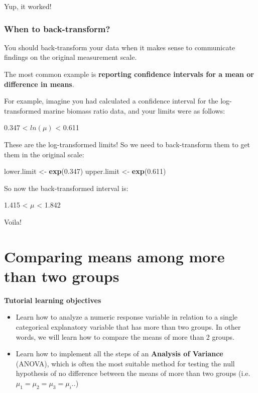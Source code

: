 \documentclass[
]{book}
\newenvironment{Shaded}{\begin{snugshade}}{\end{snugshade}}
\newcommand{\FloatTok}[1]{\textcolor[rgb]{0.00,0.00,0.81}{#1}}
\newcommand{\FunctionTok}[1]{\textcolor[rgb]{0.13,0.29,0.53}{\textbf{#1}}}
\newcommand{\NormalTok}[1]{#1}
\newcommand{\OtherTok}[1]{\textcolor[rgb]{0.56,0.35,0.01}{#1}}
\providecommand{\tightlist}{%
  \setlength{\itemsep}{0pt}\setlength{\parskip}{0pt}}
\begin{document}
Yup, it worked!

\subsection{When to back-transform?}\label{when_back}

You should back-transform your data when it makes sense to communicate findings on the original measurement scale.

The most common example is \textbf{reporting confidence intervals for a mean or difference in means}.

For example, imagine you had calculated a confidence interval for the log-transformed marine biomass ratio data, and your limits were as follows:

0.347 \textless{} \(ln(\mu)\) \textless{} 0.611

These are the log-transformed limits! So we need to back-transform them to get them in the original scale:

\begin{Shaded}
\begin{Highlighting}[]
\NormalTok{lower.limit }\OtherTok{\textless{}{-}} \FunctionTok{exp}\NormalTok{(}\FloatTok{0.347}\NormalTok{)}
\NormalTok{upper.limit }\OtherTok{\textless{}{-}} \FunctionTok{exp}\NormalTok{(}\FloatTok{0.611}\NormalTok{)}
\end{Highlighting}
\end{Shaded}

So now the back-transformed interval is:

1.415 \textless{} \(\mu\) \textless{} 1.842

Voila!

\chapter{Comparing means among more than two groups}\label{compare_three_more_means}

\textbf{Tutorial learning objectives}

\begin{itemize}
\tightlist
\item
  Learn how to analyze a numeric response variable in relation to a single categorical explanatory variable that has more than two groups. In other words, we will learn how to compare the means of more than 2 groups.\\
\item
  Learn how to implement all the steps of an \textbf{Analysis of Variance} (ANOVA), which is often the most suitable method for testing the null hypothesis of no difference between the means of more than two groups (i.e.~\(\mu_1 = \mu_2 = \mu_3 = \mu_i..\))
\end{itemize}
\end{document}
